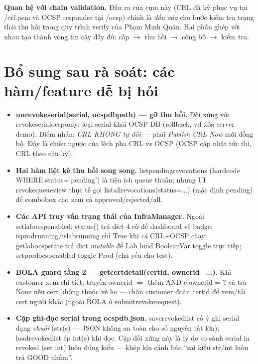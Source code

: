 \documentclass[12pt,a4paper]{article}
\newcommand{\code}[1]{{\ttfamily\small\def\_{\textunderscore\discretionary{}{}{}}#1}}
\begin{document}
\begin{notebox}
\textbf{Quan hệ với chain validation.} Đầu ra của cụm này (CRL đã ký phục vụ tại
\code{/crl.pem} và OCSP responder tại \code{/ocsp}) chính là \emph{đầu vào} cho
bước kiểm tra trạng thái thu hồi trong quy trình verify của Phạm Minh Quân. Hai
phần ghép với nhau tạo thành vòng tin cậy đầy đủ: cấp $\to$ thu hồi $\to$ công bố
$\to$ kiểm tra.
\end{notebox}

\section{Bổ sung sau rà soát: các hàm/feature dễ bị hỏi}

\begin{itemize}
  \item \textbf{\code{unrevoke\_serial(serial, ocsp\_db\_path)} --- gỡ thu hồi.}
        Đối xứng với \code{revoke\_serial\_ocsp\_only}: loại serial khỏi OCSP DB
        (rollback, vd xóa server demo). Điểm nhấn: \emph{CRL KHÔNG tự đổi} --- phải
        \emph{Publish CRL Now} mới đồng bộ. Đây là chiều ngược của lệch pha CRL vs
        OCSP (OCSP cập nhật tức thì, CRL theo chu kỳ).
  \item \textbf{Hai hàm liệt kê thu hồi song song.} \code{list\_pending\_revocations}
        (hardcode \code{WHERE status='pending'}) là tiện ích queue thuần; nhưng UI
        \code{revoke\_queue\_view} thực tế gọi \code{list\_all\_revocations(status=...)}
        (mặc định pending) để combobox cho xem cả approved/rejected/all.
  \item \textbf{Các API truy vấn trạng thái của \code{InfraManager}.} Ngoài
        \code{set\_lab\_ocsp\_enabled}: \code{status()} trả dict 4 cờ để dashboard vẽ
        badge; \code{is\_prod\_running}/\code{is\_lab\_running} chỉ True khi \emph{cả}
        CRL$+$OCSP chạy; \code{get\_lab\_ocsp\_state} trả dict \emph{mutable} để Lab
        bind \code{BooleanVar} toggle trực tiếp; \code{set\_prod\_ocsp\_enabled} toggle
        Prod (chủ yếu cho test).
  \item \textbf{BOLA guard tầng 2 --- \code{get\_cert\_detail(cert\_id, owner\_id=...)}}.
        Khi customer xem chi tiết, truyền \code{owner\_id} $\Rightarrow$ thêm
        \code{AND c.owner\_id = ?} và trả \code{None} nếu cert không thuộc về họ ---
        chặn customer đoán \code{cert\_id} để xem/tải cert người khác (ngoài BOLA ở
        \code{submit\_revoke\_request}).
  \item \textbf{Cặp ghi-đọc serial trong \code{ocsp\_db.json}.} \code{save\_revoked\_list}
        cố ý ghi serial dạng \emph{chuỗi} (\code{str(s)} --- JSON không an toàn cho
        số nguyên rất lớn); \code{load\_revoked\_list} ép \code{int(s)} khi đọc. Cặp
        đối xứng này là lý do so sánh \code{serial in revoked} (set \code{int}) luôn
        đúng kiểu --- khép kín cảnh báo ``sai kiểu str/int luôn trả GOOD nhầm''.
\end{itemize}
\end{document}
